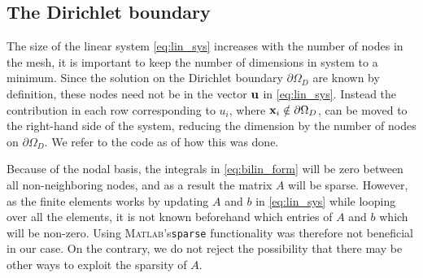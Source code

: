 \subsection{The Dirichlet boundary}
 The size of the linear system \eqref{eq:lin_sys} increases with the number of nodes in the mesh, it is important to keep the number of dimensions in system to a minimum. Since the solution on the Dirichlet boundary $\partial\Omega_D$ are known by definition, these nodes need not be in the vector $\vb{u}$ in \eqref{eq:lin_sys}. Instead the contribution in each row corresponding to $u_i$, where $\vb{x}_i \notin \partial\Omega_D$, can be moved to the right-hand side of the system, reducing the dimension by the number of nodes on $\partial\Omega_D$. We refer to the code as of how this was done.

 Because of the nodal basis, the integrals in \eqref{eq:bilin_form} will be zero between all non-neighboring nodes, and as a result the matrix $A$ will be sparse. However, as the finite elements works by updating $A$ and $b$ in \eqref{eq:lin_sys} while looping over all the elements, it is not known beforehand which entries of $A$ and $b$ which will be non-zero. Using \textsc{Matlab}'s\xspace \texttt{sparse} functionality was therefore not beneficial in our case. On the contrary, we do not reject the possibility that there may be other ways to exploit the sparsity of $A$.